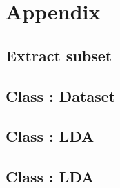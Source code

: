 \documentclass[12pt,landscape,twopage]{article}
\begin{document}



\newpage
\section{Appendix}
\subsection{Extract subset} \label{extract}


\subsection{Class : Dataset} \label{class:dataset}


\subsection{Class : LDA} \label{class:lda}


\subsection{Class : LDA} \label{code:generativeModel}

\end{document}
